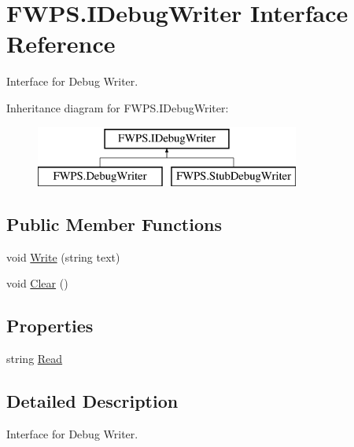 \hypertarget{interface_f_w_p_s_1_1_i_debug_writer}{}\section{F\+W\+P\+S.\+I\+Debug\+Writer Interface Reference}
\label{interface_f_w_p_s_1_1_i_debug_writer}


Interface for Debug Writer.  


Inheritance diagram for F\+W\+P\+S.\+I\+Debug\+Writer\+:\begin{figure}[H]
\begin{center}
\leavevmode
\includegraphics[height=2.000000cm]{interface_f_w_p_s_1_1_i_debug_writer}
\end{center}
\end{figure}
\subsection*{Public Member Functions}
\begin{DoxyCompactItemize}
\item 
void \mbox{\hyperlink{interface_f_w_p_s_1_1_i_debug_writer_a826f82ffa90498afa817f5eef274d5dc}{Write}} (string text)
\item 
void \mbox{\hyperlink{interface_f_w_p_s_1_1_i_debug_writer_afe3fafb517c1a3ba057d6d3ed4da0285}{Clear}} ()
\end{DoxyCompactItemize}
\subsection*{Properties}
\begin{DoxyCompactItemize}
\item 
string \mbox{\hyperlink{interface_f_w_p_s_1_1_i_debug_writer_a8dfed01e27e449d190b9a1e1e99cbdf3}{Read}}
\end{DoxyCompactItemize}


\subsection{Detailed Description}
Interface for Debug Writer. 

